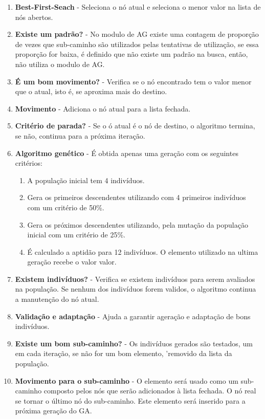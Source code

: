\begin{enumerate}
	\item \textbf{Best-First-Seach} - Seleciona o nó atual e seleciona o menor valor na lista de nós abertos.
	\item \textbf{Existe um padrão?} - No modulo de AG existe uma contagem de proporção de vezes que sub-caminho são utilizados pelas tentativas de utilização, se essa proporção for baixa, é definido que não existe um padrão na busca, então, não utiliza o modulo de AG.
	\item \textbf{É um bom movimento?} - Verifica se o nó encontrado tem o valor menor que o atual, isto é, se aproxima mais do destino.
	\item \textbf{Movimento} - Adiciona o nó atual para a lista fechada.
	\item \textbf{Critério de parada?} - Se o ó atual é o nó de destino, o algoritmo termina, se não, continua para a próxima iteração.
	\item \textbf{Algoritmo genético} - É obtida apenas uma geração com os seguintes critérios:
	\begin{enumerate}
		\item A população inicial tem 4 indivíduos.
		\item Gera os primeiros descendentes utilizando com 4 primeiros indivíduos com um critério de 50\%.
		\item Gera os próximos descendentes utilizando, pela mutação da população inicial com um critério de 25\%.
		\item É calculado a aptidão para 12 indivíduos. O elemento utilizado na ultima geração recebe o valor valor.
	\end{enumerate}
	\item \textbf{Existem indivíduos?} - Verifica se existem indivíduos para serem avaliados na população. Se nenhum dos indivíduos forem validos, o algoritmo continua a manutenção do nó atual.
	\item \textbf{Validação e adaptação} - Ajuda a garantir ageração e adaptação de bons indivíduos.
	\item \textbf{Existe um bom sub-caminho?} - Os indivíduos gerados são testados, um em cada iteração, se não for um bom elemento, 'removido da lista da população.
	\item \textbf{Movimento para o sub-caminho} - O elemento será usado como um sub-caminho composto pelos nós que serão adicionados à lista fechada. O nó real se tornar o último nó do sub-caminho. Este elemento será inserido para a próxima geração do GA.
\end{enumerate}

